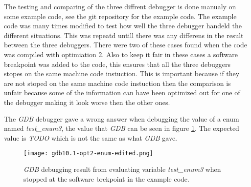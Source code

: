 

The testing and comparing of the three diffrent debugger is done manualy on some example code, see the git repository \cite{example-code} for the example code.
The example code was many times modified to test how well the three debugger handeld the different situations.
This was repeatd untill there was any differens in the result between the three debuggers.
There were two of these cases found when the code was compiled with optimiation 2.
Also to keep it fair in these cases a software breakpoint was added to the code, this ensures that all the three debuggers stopes on the same machine code instuction.
This is important because if they are not stoped on the same machine code instuction then the comparison is unfair because some of the information can have been optimized out for one of the debugger making it look worse then the other ones.


The \emph{GDB} debugger gave a wrong answer when debugging the value of a enum named \emph{test\_enum3}, the value that \emph{GDB} can be seen in figure \ref{fig:gdbenum}.
The expected value is \emph{TODO} which is not the same as what \emph{GDB} gave.


\begin{figure}[h]
	\centering
	\texttt{[image: gdb10.1-opt2-enum-edited.png]}
	\caption{\emph{GDB} debugging result from evaluating variable \emph{test\_enum3} when stopped at the software brekpoint in the example code.}
	\label{fig:gdbenum}
\end{figure}


